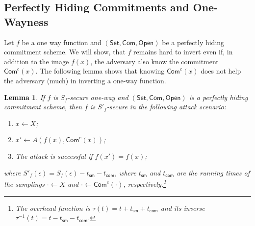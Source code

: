 \documentclass{article}
\newtheorem{lemma}{Lemma}[section]
\newcommand{\setup}[0]{\mathsf{Set}}
\newcommand{\commit}[0]{\mathsf{Com}}
\newcommand{\open}[0]{\mathsf{Open}}
\newcommand{\commitc}[0]{\mathsf{Com}^{c}}
\begin{document}
\subsection{Perfectly Hiding Commitments and One-Wayness}

Let $f$ be a one way function and $(\setup, \commit, \open)$ be a perfectly hiding commitment scheme. We will show, that $f$ remains hard to invert even if, in addition to the image $f(x)$, the adversary also know the commitment $\commitc(x)$. The following lemma shows that knowing $\commitc(x)$ does not help the adversary (much) in inverting a one-way function.

\begin{lemma}
If $f$ is $S_f$-secure one-way and $(\setup, \commit, \open)$ is a perfectly hiding commitment scheme, then $f$ is $S'_f$-secure in the following attack scenario:
\begin{enumerate}
\item $x\gets X$;
\item $x'\gets A(f(x),\commitc(x))$;
\item The attack is successful if $f(x')=f(x)$;
\end{enumerate}
where $S'_f(\epsilon) = S_f(\epsilon) - t_\mathsf{sm} - t_\mathsf{com}$, where $t_\mathsf{sm}$ and $t_\mathsf{com}$ are the running times of the samplings $\cdot\gets X$ and $\cdot\gets \commitc(\cdot)$, respectively.\footnote{The overhead function is $\tau(t)=t + t_\mathsf{sm} + t_\mathsf{com}$ and its inverse $\tau^{-1}(t) = t - t_\mathsf{sm} - t_\mathsf{com}$.}
\end{lemma}
\end{document}

